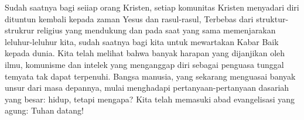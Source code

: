 Sudah saatnya bagi seiiap orang Kristen, setiap komunitas Kristen menyadari diri dituntun kembali kepada zaman Yesus dan rasul-rasul, Terbebas dari struktur-strukrur religius yang mendukung dan pada saat yang sama memenjarakan leluhur-leluhur kita, sudah saatnya bagi kita untuk mewartakan Kabar Baik kepada dunia. Kita telah melihat bahwa banyak harapan yang dijanjikan oleh ilmu, komunisme dan intelek yang menganggap diri sebagai penguasa tunggal temyata tak dapat terpenuhi. Bangsa manusia, yang sekarang menguasai banyak unsur dari masa depannya, mulai menghadapi pertanyaan-pertanyaan dasariah yang besar: hidup, tetapi mengapa? Kita telah memasuki abad evangelisasi yang agung: Tuhan datang! 